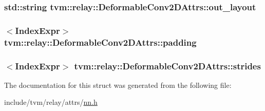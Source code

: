 \subsubsection[{\texorpdfstring{out\+\_\+layout}{out_layout}}]{\setlength{\rightskip}{0pt plus 5cm}std\+::string tvm\+::relay\+::\+Deformable\+Conv2\+D\+Attrs\+::out\+\_\+layout}\hypertarget{structtvm_1_1relay_1_1DeformableConv2DAttrs_a5fd67780be31bad0d4d1c376967817e2}{}\label{structtvm_1_1relay_1_1DeformableConv2DAttrs_a5fd67780be31bad0d4d1c376967817e2}
\subsubsection[{\texorpdfstring{padding}{padding}}]{$<${\bf Index\+Expr}$>$ tvm\+::relay\+::\+Deformable\+Conv2\+D\+Attrs\+::padding}\hypertarget{structtvm_1_1relay_1_1DeformableConv2DAttrs_a228ca1f1aeeead92fa0dd0d6e7ac6d6b}{}\label{structtvm_1_1relay_1_1DeformableConv2DAttrs_a228ca1f1aeeead92fa0dd0d6e7ac6d6b}
\subsubsection[{\texorpdfstring{strides}{strides}}]{$<${\bf Index\+Expr}$>$ tvm\+::relay\+::\+Deformable\+Conv2\+D\+Attrs\+::strides}\hypertarget{structtvm_1_1relay_1_1DeformableConv2DAttrs_a20463675cf34274bc2d8ccb75f1e2014}{}\label{structtvm_1_1relay_1_1DeformableConv2DAttrs_a20463675cf34274bc2d8ccb75f1e2014}


The documentation for this struct was generated from the following file\+:\begin{DoxyCompactItemize}
\item 
include/tvm/relay/attrs/\hyperlink{include_2tvm_2relay_2attrs_2nn_8h}{nn.\+h}\end{DoxyCompactItemize}
